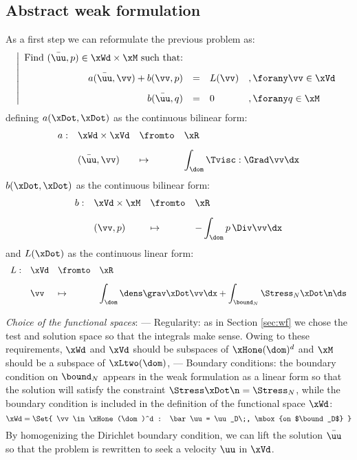 \subsection{Abstract weak formulation}

As a first step we can reformulate the previous problem as:
\begin{equation*}
\left\vert
\begin{array}{rlll}
\mbox{Find $(\bar\uu,p)\in \xWd\times\xM$ such that:}\\[2ex]
\displaystyle a(\bar\uu,\vv) + b(\vv, p) &=& L(\vv)& ,\forany\vv\in\xVd\\[2ex]
\displaystyle b(\bar\uu,q) &=& 0 & ,\forany q\in\xM
\end{array}
\right.
\end{equation*}
defining $a(\xDot,\xDot)$ as the continuous bilinear form:
\begin{equation*}
\begin{array}{rlll}
a :& \xWd\times\xVd & \fromto & \xR \\[2ex]
   & (\bar\uu,\vv)      & \mapsto & \displaystyle \int_\dom \Tvisc:\Grad\vv\dx
\end{array}
\end{equation*}
$b(\xDot,\xDot)$ as the continuous bilinear form:
\begin{equation*}
\begin{array}{rlll}
b :& \xVd\times\xM  & \fromto & \xR \\[2ex]
   & (\vv , p)      & \mapsto & \displaystyle - \int_\dom p\,\Div\vv\dx
\end{array}
\end{equation*}
and $L(\xDot)$ as the continuous linear form:
\begin{equation*}
\begin{array}{rlll}
L :& \xVd   & \fromto & \xR \\[2ex]
   & \vv    & \mapsto & \displaystyle \displaystyle\int_\dom \dens\grav\xDot\vv\dx + \int_{\bound_N}\Stress_N\xDot\n\ds
\end{array}
\end{equation*}

\medskip
\textit{Choice of the functional spaces}:
--- Regularity: as in Section \ref{sec:wf} we chose the test and solution space so that the integrals make sense.
Owing to these requirements, $\xWd$ and $\xVd$ should be subspaces of $\xHone(\dom)^d$ and $\xM$ should be a subspace of $\xLtwo(\dom)$,
--- Boundary conditions: the boundary condition on $\bound_N$ appears in the weak formulation as a linear form so that the solution will satisfy the constraint $\Stress\xDot\n = \Stress_N$, while the boundary condition is included in the definition of the functional space $\xWd$:
\begin{equation*}
\xWd = \Set{ \vv \in \xHone(\dom)^d : \bar\uu = \uu_D\;, \mbox{on $\bound_D$} }
\end{equation*}
By homogenizing the Dirichlet boundary condition, we can lift the solution $\bar\uu$ so that the problem is rewritten to seek a velocity $\uu$ in $\xVd$.

